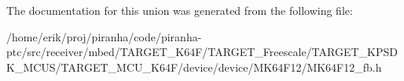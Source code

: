 The documentation for this union was generated from the following file\+:\begin{DoxyCompactItemize}
\item 
/home/erik/proj/piranha/code/piranha-\/ptc/src/receiver/mbed/\+T\+A\+R\+G\+E\+T\+\_\+\+K64\+F/\+T\+A\+R\+G\+E\+T\+\_\+\+Freescale/\+T\+A\+R\+G\+E\+T\+\_\+\+K\+P\+S\+D\+K\+\_\+\+M\+C\+U\+S/\+T\+A\+R\+G\+E\+T\+\_\+\+M\+C\+U\+\_\+\+K64\+F/device/device/\+M\+K64\+F12/M\+K64\+F12\+\_\+fb.\+h\end{DoxyCompactItemize}
